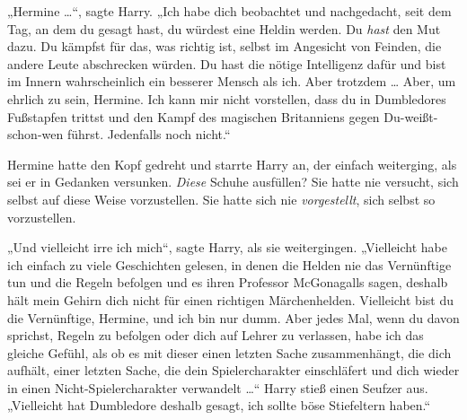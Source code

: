 „Hermine …“, sagte Harry.
„Ich habe dich beobachtet und nachgedacht, seit dem Tag, an dem du gesagt hast, du würdest eine Heldin werden. Du \emph{hast} den Mut dazu. Du kämpfst für das, was richtig ist, selbst im Angesicht von Feinden, die andere Leute abschrecken würden. Du hast die nötige Intelligenz dafür und bist im Innern wahrscheinlich ein besserer Mensch als ich. Aber trotzdem … Aber, um ehrlich zu sein, Hermine. Ich kann mir nicht vorstellen, dass du in Dumbledores Fußstapfen trittst und den Kampf des magischen Britanniens gegen Du-weißt-schon-wen führst. Jedenfalls noch nicht.“

Hermine hatte den Kopf gedreht und starrte Harry an, der einfach weiterging, als sei er in Gedanken versunken. \emph{Diese} Schuhe ausfüllen? Sie hatte nie versucht, sich selbst auf diese Weise vorzustellen. Sie hatte sich nie \emph{vorgestellt}, sich selbst so vorzustellen.

„Und vielleicht irre ich mich“, sagte Harry, als sie weitergingen.
„Vielleicht habe ich einfach zu viele Geschichten gelesen, in denen die Helden nie das Vernünftige tun und die Regeln befolgen und es ihren Professor McGonagalls sagen, deshalb hält mein Gehirn dich nicht für einen richtigen Märchenhelden. Vielleicht bist du die Vernünftige, Hermine, und ich bin nur dumm. Aber jedes Mal, wenn du davon sprichst, Regeln zu befolgen oder dich auf Lehrer zu verlassen, habe ich das gleiche Gefühl, als ob es mit dieser einen letzten Sache zusammenhängt, die dich aufhält, einer letzten Sache, die dein Spielercharakter einschläfert und dich wieder in einen Nicht-Spielercharakter verwandelt …“ Harry stieß einen Seufzer aus.
„Vielleicht hat Dumbledore deshalb gesagt, ich sollte böse Stiefeltern haben.“

